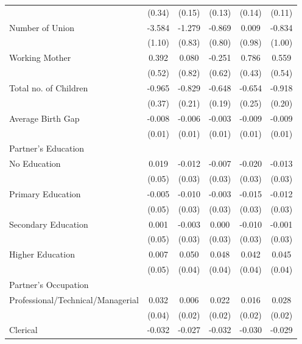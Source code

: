 \begin{longtable}{l*{5}{c}}
                    & (0.34) & (0.15) & (0.13) & (0.14) & (0.11) \\
Number of Union & -3.584\sym{***} & -1.279 & -0.869 & 0.009 & -0.834 \\
                    & (1.10) & (0.83) & (0.80) & (0.98) & (1.00) \\
Working Mother & 0.392 & 0.080 & -0.251 & 0.786\sym{*} & 0.559 \\
                    & (0.52) & (0.82) & (0.62) & (0.43) & (0.54) \\
Total no. of Children & -0.965\sym{**} & -0.829\sym{***} & -0.648\sym{***} & -0.654\sym{**} & -0.918\sym{***} \\
                    & (0.37) & (0.21) & (0.19) & (0.25) & (0.20) \\
Average Birth Gap & -0.008 & -0.006 & -0.003 & -0.009 & -0.009 \\
                    & (0.01) & (0.01) & (0.01) & (0.01) & (0.01) \\
\multicolumn{6}{l}{Partner's Education} \\
\hspace{1em}No Education & 0.019 & -0.012 & -0.007 & -0.020 & -0.013 \\
                    & (0.05) & (0.03) & (0.03) & (0.03) & (0.03) \\
\hspace{1em}Primary Education & -0.005 & -0.010 & -0.003 & -0.015 & -0.012 \\
                    & (0.05) & (0.03) & (0.03) & (0.03) & (0.03) \\
\hspace{1em}Secondary Education & 0.001 & -0.003 & 0.000 & -0.010 & -0.001 \\
                    & (0.05) & (0.03) & (0.03) & (0.03) & (0.03) \\
\hspace{1em}Higher Education & 0.007 & 0.050 & 0.048 & 0.042 & 0.045 \\
                    & (0.05) & (0.04) & (0.04) & (0.04) & (0.04) \\
\multicolumn{6}{l}{Partner's Occupation} \\
\hspace{1em}Professional/Technical/Managerial & 0.032 & 0.006 & 0.022 & 0.016 & 0.028 \\
                    & (0.04) & (0.02) & (0.02) & (0.02) & (0.02) \\
\hspace{1em}Clerical & -0.032 & -0.027 & -0.032 & -0.030 & -0.029 \\

\end{longtable}
